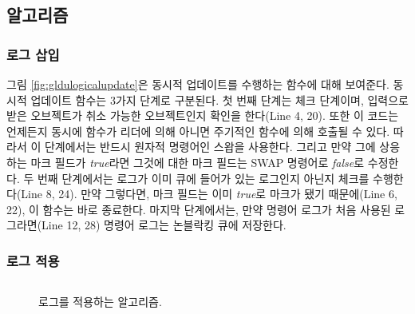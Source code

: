 \subsection{알고리즘}

\subsubsection{로그 삽입}
그림 \ref{fig:gldulogicalupdate}은 동시적 업데이트를 수행하는 함수에 대해 보여준다.
동시적 업데이트 함수는 3가지 단계로 구분된다.
첫 번째 단계는 체크 단계이며, 입력으로 받은 오브젝트가 취소 가능한 오브젝트인지 확인을 한다(Line 4, 20). 
또한 이 코드는 언제든지 동시에  함수가 리더에 의해 아니면 주기적인 함수에 의해 
호출될 수 있다.
따라서 이 단계에서는 반드시 원자적 명령어인 스왑을 사용한다.
그리고 만약 그에 상응하는 마크 필드가 \textit{true}라면 그것에 대한 마크 필드는 SWAP 명령어로 \textit{false}로
수정한다.
두 번째 단계에서는 로그가 이미 큐에 들어가 있는 로그인지 아닌지 체크를 수행한다(Line 8, 24).
만약 그렇다면, 마크 필드는 이미 \textit{true}로 마크가 됐기 때문에(Line 6, 22), 이 함수는 
바로 종료한다.
마지막 단계에서는, 만약 명령어 로그가 처음 사용된 로그라면(Line 12, 28) 명령어 로그는 
논블락킹 큐에 저장한다.

\subsubsection{로그 적용}

\begin{figure}[h]
\begin{center}
\inputminted[linenos,fontsize=\footnotesize, tabsize=4]{c}{src/ldu_physical.c}
\end{center}
\caption{로그를 적용하는 알고리즘.}
\label{fig:glduphysicalupdate}
\end{figure}


